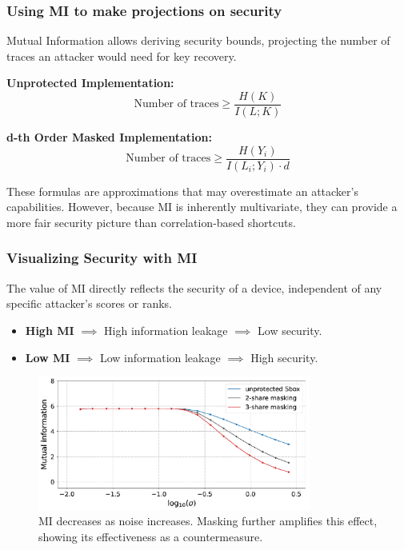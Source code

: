 \begin{frame}
    \frametitle{Using MI to make projections on security}

    Mutual Information allows deriving security bounds, projecting the number of traces an attacker would need for key recovery.
    
    \textbf{Unprotected Implementation:}
    $$ \text{Number of traces} \ge \frac{H(K)}{I(L;K)} $$
    
    \textbf{d-th Order Masked Implementation:}
    $$ \text{Number of traces} \ge \frac{H(Y_i)}{I(L_i;Y_i) \cdot d} $$

    \begin{alertblock}{}
        These formulas are approximations that may overestimate an attacker's capabilities. However, because MI is inherently multivariate, they can provide a more fair security picture than correlation-based shortcuts.
    \end{alertblock}
\end{frame}

\begin{frame}
    \frametitle{Visualizing Security with MI}
    
    The value of MI directly reflects the security of a device, independent of any specific attacker's scores or ranks.
    
    \begin{itemize}
        \item \textbf{High MI} $\implies$ High information leakage $\implies$ Low security.
        \item \textbf{Low MI} $\implies$ Low information leakage $\implies$ High security.
    \end{itemize}

    \begin{figure}
        \centering
        \includegraphics[width=0.8\textwidth]{metrics/Pictures/MI_masking.png}
        \caption{MI decreases as noise increases. Masking further amplifies this effect, showing its effectiveness as a countermeasure.}
    \end{figure}
\end{frame}




